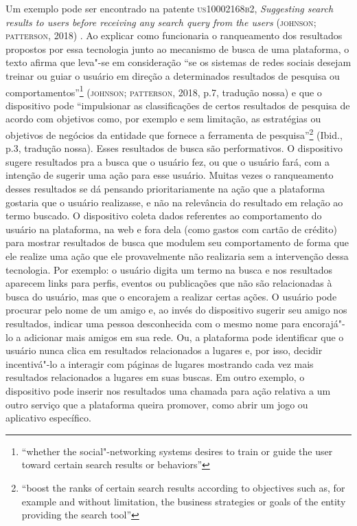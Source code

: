 Um exemplo pode ser encontrado na patente \textsc{us10002168b2}, \emph{Suggesting
search results to users before receiving any search query from the
users} (\textsc{johnson}; \textsc{patterson}, 2018) . Ao explicar como funcionaria o
ranqueamento dos resultados propostos por essa tecnologia junto ao
mecanismo de busca de uma plataforma, o texto afirma que leva"-se em
consideração ``se os sistemas de redes sociais desejam treinar ou guiar
o usuário em direção a determinados resultados de pesquisa ou
comportamentos''\footnote{``whether the social"-networking systems
  desires to train or guide the user toward certain search results or
  behaviors''} (\textsc{johnson}; \textsc{patterson}, 2018, p.7, tradução nossa) e que o
dispositivo pode ``impulsionar as classificações de certos resultados de
pesquisa de acordo com objetivos como, por exemplo e sem limitação, as
estratégias ou objetivos de negócios da entidade que fornece a
ferramenta de pesquisa''\footnote{``boost the ranks of certain search
  results according to objectives such as, for example and without
  limitation, the business strategies or goals of the entity providing
  the search tool''} (Ibid., p.3, tradução nossa). Esses resultados de
busca são performativos. O dispositivo sugere resultados pra a busca que
o usuário fez, ou que o usuário fará, com a intenção de sugerir uma ação
para esse usuário. Muitas vezes o ranqueamento desses resultados se dá
pensando prioritariamente na ação que a plataforma gostaria que o
usuário realizasse, e não na relevância do resultado em relação ao termo
buscado. O dispositivo coleta dados referentes ao comportamento do
usuário na plataforma, na web e fora dela (como gastos com cartão de
crédito) para mostrar resultados de busca que modulem seu comportamento
de forma que ele realize uma ação que ele provavelmente não realizaria
sem a intervenção dessa tecnologia. Por exemplo: o usuário digita um
termo na busca e nos resultados aparecem links para perfis, eventos ou
publicações que não são relacionadas à busca do usuário, mas que o
encorajem a realizar certas ações. O usuário pode procurar pelo nome de
um amigo e, ao invés do dispositivo sugerir seu amigo nos resultados,
indicar uma pessoa desconhecida com o mesmo nome para encorajá"-lo a
adicionar mais amigos em sua rede. Ou, a plataforma pode identificar que
o usuário nunca clica em resultados relacionados a lugares e, por isso,
decidir incentivá"-lo a interagir com páginas de lugares mostrando cada
vez mais resultados relacionados a lugares em suas buscas. Em outro
exemplo, o dispositivo pode inserir nos resultados uma chamada para ação
relativa a um outro serviço que a plataforma queira promover, como abrir
um jogo ou aplicativo específico.

